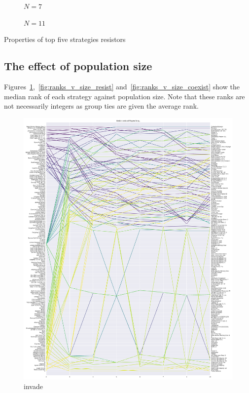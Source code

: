 \documentclass{article}
\begin{document}
\begin{table}[!hbtp]
    \begin{subfigure}[t]{\textwidth}
        \centering
        
        \caption{\(N=7\)}
    \end{subfigure}
    \begin{subfigure}[t]{\textwidth}
        \centering
        
        \caption{\(N=11\)}
    \end{subfigure}
    \caption{Properties of top five strategies resistors}
    \label{tbl:top_five_invade}
\end{table}

\subsection{The effect of population size}\label{sec:population_size}

Figures~\ref{fig:ranks_v_size_invade},~\ref{fig:ranks_v_size_resist}
and~\ref{fig:ranks_v_size_coexist} show the median rank of each strategy against
population size. Note that these ranks are
not necessarily integers as group ties are given the average rank.

\begin{figure}[!hbtp]
    \centering
    \includegraphics[height=.9\textheight]{../img/median_rank_vs_population_size_invade.pdf}
    \caption{invade}
    \label{fig:ranks_v_size_invade}
\end{figure}
\end{document}
